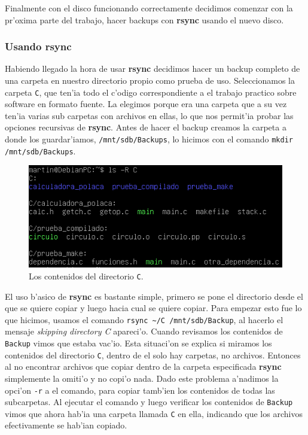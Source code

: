 \documentclass[11pt]{article}
\newcommand{\rsync}[0]{\textbf{rsync}}
\newcommand{\backup}[0]{\texttt{Backup}}
\begin{document}
		Finalmente con el disco funcionando correctamente decidimos comenzar con la pr'oxima parte del trabajo, hacer backups con \rsync{} usando el nuevo disco.

	\subsubsection{Usando rsync}
		Habiendo llegado la hora de usar \rsync{} decidimos hacer un backup completo de una carpeta en nuestro directorio propio como prueba de uso. Seleccionamos la carpeta \texttt{C}, que ten'ia todo el c'odigo correspondiente a el trabajo practico sobre software en formato fuente. La elegimos porque era una carpeta que a su vez ten'ia varias sub carpetas con archivos en ellas, lo que nos permit'ia probar las opciones recursivas de \rsync{}. Antes de hacer el backup creamos la carpeta a donde los guardar'iamos, \texttt{/mnt/sdb/Backups}, lo hicimos con el comando \texttt{mkdir /mnt/sdb/Backups}.

		\begin{figure}[H]
    			\centering
    			\includegraphics[scale=0.80]{Images/rsync/rsync_backup_C_contents.PNG}
    			\caption{Los contenidos del directorio \texttt{C}.}
    			\label{fig:rsync_C_contents}
		\end{figure}

		El uso b'asico de \rsync{} es bastante simple, primero se pone el directorio desde el que se quiere copiar y luego hacia cual se quiere copiar. Para empezar esto fue lo que hicimos, usamos el comando \texttt{rsync \textasciitilde/C /mnt/sdb/Backup}, al hacerlo el mensaje \textit{skipping directory C} apareci'o. Cuando revisamos los contenidos de \backup{} vimos que estaba vac'io. Esta situaci'on se explica si miramos los contenidos del directorio \texttt{C}, dentro de el solo hay carpetas, no archivos. Entonces al no encontrar archivos que copiar dentro de la carpeta especificada \rsync{} simplemente la omiti'o y no copi'o nada. Dado este problema a'nadimos la opci'on \texttt{-r} a el comando,  para copiar tamb'ien los contenidos de todas las subcarpetas. Al ejecutar el comando y luego verificar los contenidos de \backup{} vimos que ahora hab'ia una carpeta llamada \texttt{C} en ella, indicando que los archivos efectivamente se hab'ian copiado.
\end{document}
